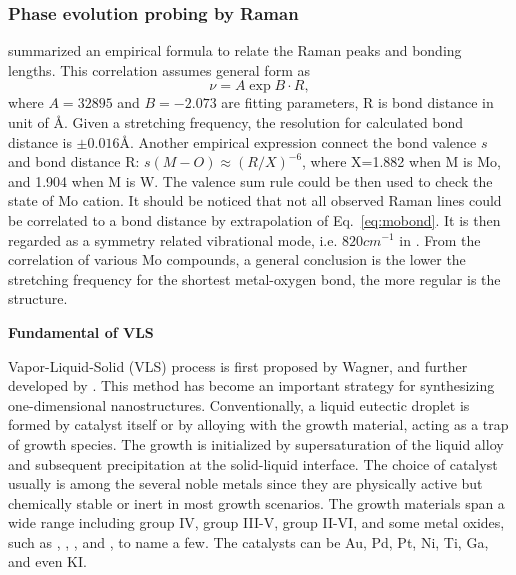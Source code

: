 \subsubsection{Phase evolution probing by Raman}

\citeauthor{Hardcastle1990} summarized an empirical formula to relate the Raman peaks and  bonding lengths.\cite{Hardcastle1990} This correlation assumes general form as
\begin{equation}\label{eq:mobond}
\nu = A \exp{B\cdot R},
\end{equation}
where $A=32895$ and $B=-2.073$ are fitting parameters, R is bond distance in unit of \AA. Given a stretching frequency, the resolution for calculated bond distance is $\pm0.016$\AA. Another empirical expression connect the bond valence $s$ and bond distance R: $s(M-O) \approx (R/X)^{-6} $, where X=1.882 when M is Mo, and 1.904 when M is W. The valence sum rule could be then used to check the state of Mo cation. It should be noticed that not all observed Raman lines could be correlated to a  bond distance by extrapolation of Eq.~\ref{eq:mobond}. It is then regarded as a symmetry related vibrational mode, i.e. $820 cm^{-1}$ in . From the correlation of various Mo compounds, a general conclusion is the lower the stretching frequency for the shortest metal-oxygen bond, the more regular is the structure.


\textbf{Fundamental of VLS}

Vapor-Liquid-Solid (VLS) process is first proposed by Wagner,\cite{Wagner1964} and further developed by \citeauthor{Givargizov1975}.\cite{Givargizov1975} This method has become an important strategy for synthesizing one-dimensional nanostructures.\cite{Lieber1998} Conventionally, a liquid eutectic droplet is formed by catalyst itself or by alloying with the growth material, acting as a trap of growth species. The growth is initialized by supersaturation of the liquid alloy and subsequent precipitation at the solid-liquid interface. The choice of catalyst usually is among the several noble metals since they are physically active but chemically stable or inert in most growth scenarios. The growth materials span a wide range including group IV,\cite{Hochbaum2005} group III-V,\citep{Dalacu2013, Xiao2012, Dubrovskii2011} group II-VI,\cite{Hao2006} and some metal oxides, such as ,\citep{Huang2001a,Ramgir2010} ,\citep{HEUER1967, Nagashima2007} ,\cite{Pan2002} and ,\cite{Zhuge2012} to name a few. The catalysts can be Au, Pd, Pt, Ni,\cite{Xiao2012} Ti, Ga,\cite{Pan2002} and even KI.

